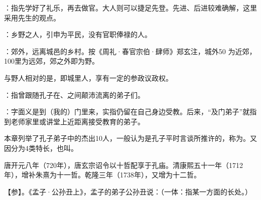 {
\item {}：指先学好了礼乐，再去做官。大人则可以捷足先登。先进、后进较难确解，这里采用先生的观点。

\item {}：乡野之人，引申为平民，没有官职俸禄的人。

：郊外，远离城邑的乡村。按《周礼·春官宗伯·肆师》郑玄注，城外50 为近郊，100里为远郊，郊之外即为野。

与野人相对的是，即城里人，享有一定的参政议政权。
}
{}


{
\item {}：指曾跟随孔子在、之间颠沛流离的弟子们。%
\item {}：字面义是到（我的）门里来，实指仍留在自己身边受教。后来，“及门弟子”就指到老师家里或讲堂上近距离接受教育的弟子。
}
{}


{
本章列举了孔子弟子中的杰出10人，一般认为是孔子平时言谈所推许的，称为。又因分为4类特长，也叫。

唐开元八年（720年），唐玄宗诏令以十哲配享于孔庙。清康熙五十一年（1712年），增补朱熹为十一哲。乾隆三年（1738年），又增为十二哲。

【参】。《孟子·公孙丑上》，孟子的弟子公孙丑说：（一体：指某一方面的长处。）
}
{
}  %


